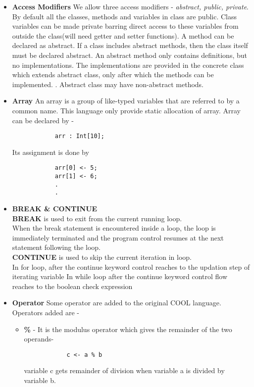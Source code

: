\documentclass[11pt]{article}
\begin{document}
\begin{enumerate}
\begin{itemize}
        \item \textbf{Access Modifiers} We allow three access modifiers - \textit{abstract, public, private}. By default all the classes, methods and  variables in class are public. Class variables can be made private barring direct access to these variables from outside the class(will need getter and setter functions). A method can be declared as abstract. If a class includes abstract methods, then the class itself must be declared abstract. An abstract method only contains definitions, but no implementations. The implementations are provided in the concrete class which extends abstract class, only after which the methods can be implemented. . Abstract class may have non-abstract methods.
        
        \item \textbf{Array} An array is a group of like-typed variables that are referred to by a common name. This language only provide static allocation of array. Array can be declared by - 
        \begin{verbatim}
            arr : Int[10];
        \end{verbatim}
        \vspace{-0.5cm}
        Its assignment is done by 
        \begin{verbatim}
            arr[0] <- 5;
            arr[1] <- 6;
            .
            .
        \end{verbatim}
        \vspace{-0.5cm}
        
        \item \textbf{BREAK \& CONTINUE}\\
        
        \textbf{BREAK} is used to exit from the current running loop.\\ When the break statement is encountered inside a loop, the loop is immediately terminated and the program control resumes at the next statement following the loop.\\
        
        \textbf{CONTINUE} is used to skip the current iteration in loop. \\
        In for loop, after the continue keyword control reaches to the updation step of iterating variable
        In while loop after the continue keyword control flow reaches to the boolean check expression
        
        \item \textbf{Operator}
        Some operator are added to the original COOL language. Operators added are -
        \begin{itemize}
            \item \textbf{\%} - It is the modulus operator which gives the remainder of the two operands-
            \begin{verbatim}
            c <- a % b
            \end{verbatim}
            \vspace{-0.5cm}
            variable c gets remainder of division when variable a is divided by variable b.
            

\end{itemize}
\end{itemize}
\end{enumerate}
\end{document}
